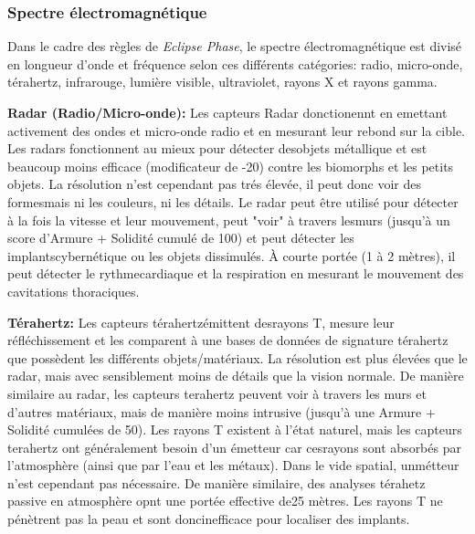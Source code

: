 \subsubsection{Spectre électromagnétique} 

Dans le cadre des règles de \textit{Eclipse Phase}, le spectre électromagnétique est divisé en longueur d'onde et fréquence selon ces différents catégories: radio, micro-onde, térahertz, infrarouge, lumière visible, ultraviolet, rayons X et rayons gamma. 

\textbf{Radar (Radio/Micro-onde): }Les capteurs Radar donctionennt en emettant activement des ondes et micro-onde radio et en mesurant leur rebond sur la cible. Les radars fonctionnent au mieux pour détecter desobjets métallique et est beaucoup moins efficace (modificateur de -20) contre les biomorphs et les petits objets. La résolution n'est cependant pas trés élevée, il peut donc voir des formesmais ni les couleurs, ni les détails. Le radar peut être utilisé pour détecter à la fois la vitesse et leur mouvement, peut "voir" à travers lesmurs (jusqu'à un score d'Armure + Solidité cumulé de 100) et peut détecter les implantscybernétique ou les objets dissimulés. À courte portée (1 à 2 mètres), il peut détecter le rythmecardiaque et la respiration en mesurant le mouvement des cavitations thoraciques. 

\textbf{Térahertz:} Les capteurs térahertzémittent desrayons T, mesure leur réfléchissement et les comparent à une bases de données de signature térahertz que possèdent les différents objets/matériaux. La résolution est plus élevées que le radar, mais avec sensiblement moins de détails que la vision normale. De manière similaire au radar, les capteurs terahertz peuvent voir à travers les murs et d'autres matériaux, mais de manière moins intrusive (jusqu'à une Armure + Solidité cumulées de 50). Les rayons T existent à l'état naturel, mais les capteurs terahertz ont généralement besoin d'un émetteur car cesrayons sont absorbés par l'atmosphère (ainsi que par l'eau et les métaux). Dans le vide spatial, unmétteur n'est cependant pas nécessaire. De manière similaire, des analyses térahetz passive en atmosphère opnt une portée effective de25 mètres. Les rayons T ne pénètrent pas la peau et sont doncinefficace pour localiser des implants. 


